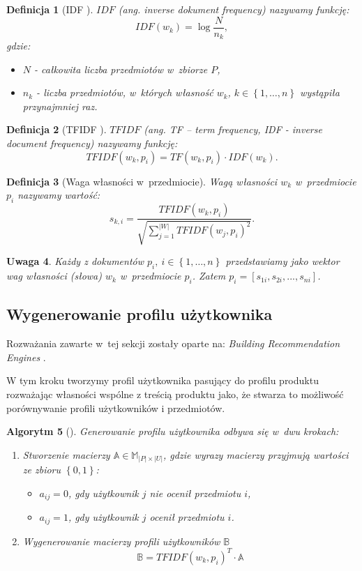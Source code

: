 \documentclass[12pt,a4paper]{report}
\newtheorem{df}{Definicja}[chapter]
\newtheorem{algorytm}[df]{Algorytm}
\newtheorem{uwaga}[df]{Uwaga}
\newcommand{\set}[1]{\left\lbrace {#1} \right\rbrace}
\newcommand{\setUzytkownicy}{\mathit{U}}
\newcommand{\setPrzedmioty}{\mathit{P}}
\begin{document}
\begin{df}[IDF {\citep[Sec 3.3.1.1]{rsh}}]
$IDF$ (ang. \textit{inverse dokument frequency}) nazywamy funkcję:
$$
IDF(w_k) = \log \frac{N}{n_k},
$$
gdzie:
\begin{itemize}
\item $N$ - całkowita liczba przedmiotów w~zbiorze $\setPrzedmioty$,
\item $n_k$ - liczba przedmiotów, w~których własność $w_k$, $k \in \set{1, \ldots, n}$ wystąpiła przynajmniej raz.
\end{itemize}
\end{df}

\begin{df}[TFIDF {\citep[Sec 3.3.1.1]{rsh}}]
$TFIDF$ (ang. \textit{TF – term frequency, IDF - inverse document frequency}) nazywamy funkcję:
$$
TFIDF(w_k, p_i) = TF(w_k, p_i) \cdot IDF(w_k).
$$
\end{df}

\begin{df}[Waga własności w~przedmiocie]
Wagą własności $w_k$ w~przedmiocie $p_i$ nazywamy wartość:
$$
s_{k,i} = \frac{TFIDF(w_k, p_i)}{\sqrt{ \sum_{j=1}^{|W|}{TFIDF(w_j, p_i)}^2}}.
$$
\end{df}

\begin{uwaga}
Każdy z dokumentów $p_i, \: i\in\set{1,\ldots,n} $ przedstawiamy jako wektor wag własności (słowa) $w_k$ w~przedmiocie $p_i$. Zatem $ p_i = [s_{1i}, s_{2i},...,s_{ni}] $.
\end{uwaga}


\subsection{Wygenerowanie profilu użytkownika}
Rozważania zawarte w~tej sekcji zostały oparte na: \textit{Building Recommendation Engines} {\citep[Sec 3]{bre}}.

W tym kroku tworzymy profil użytkownika pasujący do profilu produktu rozważając własności wspólne z treścią produktu jako, że stwarza to możliwość porównywanie profili użytkowników i przedmiotów.

\begin{algorytm}[{\citep[Sec 3]{bre}}]
Generowanie profilu użytkownika odbywa się w~dwu krokach:
\begin{enumerate}
\item Stworzenie macierzy $\mathbb{A} \in \mathbb{M}_{|\setPrzedmioty| \times |\setUzytkownicy| }$, gdzie wyrazy macierzy przyjmują wartości ze zbioru $\set{0,1}$:
\begin{itemize}
\item $a_{ij} = 0$, gdy użytkownik $j$ nie ocenił przedmiotu $i$,
\item $a_{ij} = 1$, gdy użytkownik $j$ ocenił przedmiotu $i$.
\end{itemize}
\item Wygenerowanie macierzy profili użytkowników $\mathbb{B}$
$$
\mathbb{B} = TFIDF(w_k, p_i)^T \cdot \mathbb{A}
$$
\end{enumerate} 

\end{algorytm}
\bigskip
\bigskip
\bigskip
\end{document}
